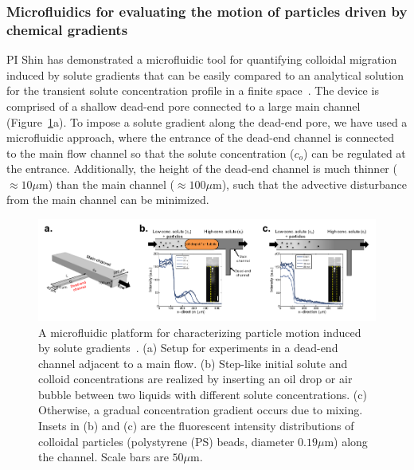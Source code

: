 \documentclass[11pt]{article}
\begin{document}
\subsubsection{Microfluidics for evaluating the motion of particles driven by chemical gradients\label{subsubsec:microfluidics}}
PI Shin has demonstrated a microfluidic tool for quantifying colloidal
migration induced by solute gradients that can be easily compared to an
analytical solution for the transient solute concentration profile in a
finite space~\cite{shin2016,shin2017a,shin2017b}. The device is
comprised of a shallow dead-end pore connected to a large main channel
(Figure~\ref{fig:fig3}a).  To impose a solute gradient along the
dead-end pore, we have used a microfluidic approach, where the entrance
of the dead-end channel is connected to the main flow channel so that
the solute concentration ($c_o$) can be regulated at the entrance.
Additionally, the height of the dead-end channel is much thinner
($\approx 10 \mu$m) than the main channel ($\approx 100 \mu$m), such
that the advective disturbance from the main channel can be minimized.
%
\begin{figure}[h]
\begin{center}
\includegraphics*[keepaspectratio=true,scale=1]{figs/fig3.pdf}
\caption{\label{fig:fig3} A microfluidic platform for characterizing
  particle motion induced by solute gradients~\cite{shin2016,
  shin2017a}. (a) Setup for experiments in a dead-end channel adjacent
  to a main flow. (b) Step-like initial solute and colloid
  concentrations are realized by inserting an oil drop or air bubble
  between two liquids with different solute concentrations. (c)
  Otherwise, a gradual concentration gradient occurs due to mixing.
  Insets in (b) and (c) are the fluorescent intensity distributions of
  colloidal particles (polystyrene (PS) beads, diameter $0.19 \mu$m)
  along the channel. Scale bars are $50 \mu$m.}
\end{center}
\end{figure}
\end{document}
